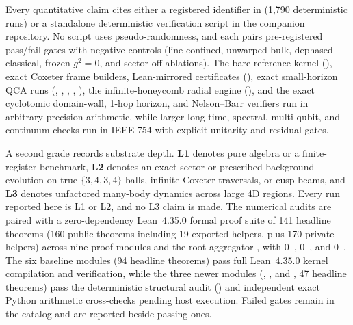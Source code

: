 Every quantitative claim cites either a registered identifier in  \cite{cluesurf2026repo}
(1,790 deterministic runs) or a standalone deterministic verification script in the companion repository. No script uses
pseudo-randomness, and each pairs pre-registered pass/fail gates with negative controls (line-confined, unwarped bulk,
dephased classical, frozen $g^2 = 0$, and sector-off ablations). The bare reference kernel (\universecode), exact
Coxeter frame builders, Lean-mirrored certificates (), exact small-horizon QCA runs
(, , , , ), the infinite-honeycomb
radial engine (), and the exact cyclotomic domain-wall, 1-hop horizon, and Nelson--Barr verifiers run
in arbitrary-precision  arithmetic, while larger long-time, spectral, multi-qubit, and continuum checks run
in IEEE-754  with explicit unitarity and residual gates.

A second grade records substrate depth. \textbf{L1} denotes pure algebra or a finite-register benchmark, \textbf{L2}
denotes an exact sector or prescribed-background evolution on true $\{3,4,3,4\}$ balls, infinite Coxeter traversals, or
cusp beams, and \textbf{L3} denotes unfactored many-body dynamics across large 4D regions. Every run reported here is
L1 or L2, and no L3 claim is made. The numerical audits are paired with a zero-dependency Lean~4.35.0 formal proof suite
of 141 headline theorems (160 public theorems including 19 exported helpers, plus 170 private helpers) across nine proof
modules and the root aggregator , with 0~, 0~, and 0~.
The six baseline modules (94 headline theorems) pass full Lean~4.35.0 kernel compilation and 
verification, while the three newer modules (, , and
, 47 headline theorems) pass the deterministic structural audit () and independent exact Python arithmetic cross-checks pending host  execution. Failed
gates remain in the catalog and are reported beside passing ones.

